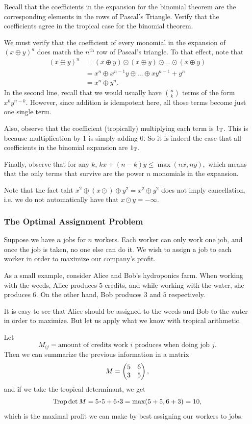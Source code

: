 \documentclass[12pt]{memoir}
\DeclareMathOperator{\Trop}{Trop}
\theoremstyle{definition}
\begin{document}
\begin{Ej}
Recall that the coefficients in the expansion for the binomial theorem are the corresponding elements in the rows of Pascal's Triangle. Verify that the coefficients agree in the tropical case for the binomial theorem.
\end{Ej}

\begin{ptcb}
We must verify that the coefficient of every monomial in the expansion of $(x\oplus y)^n$ does match the $n^{\text{th}}$ row of Pascal's triangle. To that effect, note that 
\begin{align*}
    (x\oplus y)^n&=(x\oplus y)\odot(x\oplus y)\odot\dots\odot(x\oplus y)\\
    &=x^n\oplus x^{n-1}y\oplus\dots\oplus xy^{n-1}+y^n\\
    &=x^n\oplus y^n.
\end{align*}
In the second line, recall that we would usually have $\binom{n}{k}$ terms of the form $x^ky^{n-k}$. However, since addition is idempotent here, all those terms become just one single term.\par 
Also, observe that the coefficient (tropically) multiplying each term is $1_{\mathbb{T}}$. This is because multiplication by 1 is simply adding 0. So it is indeed the case that all coefficients in the binomial expansion are $1_{\mathbb{T}}$.\par 
Finally, observe that for any $k$, $kx+(n-k)y\leq\max(nx,ny),$ which means that the only terms that survive are the power $n$ monomials in the expansion. 
\end{ptcb}

Note that the fact taht $x^2 \oplus (x \odot ) \oplus y^2 = x^2 \oplus y^2$ does not imply cancellation, i.e. we do not automatically have that $x \odot y = -\infty$.


\subsubsection{The Optimal Assignment Problem}

Suppose we have $n$ jobs for $n$ workers. Each worker can only work one job, and once the job is taken, no one else can do it. We wish to assign a job to each worker in order to maximize our company's profit.

\begin{Ex}
    As a small example, consider Alice and Bob's hydroponics farm. When working with the weeds, Alice produces $5$ credits, and while working with the water, she produces $6$. On the other hand, Bob produces $3$ and $5$ respectively.\par 
    It is easy to see that Alice should be assigned to the weeds and Bob to the water in order to maximize. But let us apply what we know with tropical arithmetic.\par 
    Let 
    $$M_{ij}=\text{amount of credits work }i\text{ produces when doing job }j.$$
    Then we can summarize the previous information in a matrix 
    $$M=\begin{pmatrix} 5 & 6 \\ 3 & 5 \end{pmatrix},$$
    and if we take the tropical determinant, we get
    $$\Trop\det M=5\.5+6\.3=\max(5+5,6+3)=10,$$
    which is the maximal profit we can make by best assigning our workers to jobs.
\end{Ex}
\end{document}
